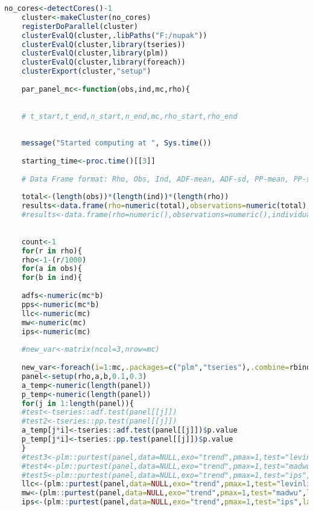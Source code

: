 \begin{lstlisting}[language=R]
	no_cores<-detectCores()-1
	cluster<-makeCluster(no_cores)
	registerDoParallel(cluster)
	clusterEvalQ(cluster,.libPaths("F:/nupak"))
	clusterEvalQ(cluster,library(tseries))
	clusterEvalQ(cluster,library(plm))
	clusterEvalQ(cluster,library(foreach))
	clusterExport(cluster,"setup")
	
	par_panel_mc<-function(obs,ind,mc,rho){
	
	
	# t_start,t_end,n_start,n_end,mc,rho_start,rho_end
	
	
	message("Started computing at ", Sys.time())
	
	starting_time<-proc.time()[[3]]
	
	# Data Frame format: Rho, Obs, Ind, ADF-mean, ADF-sd, PP-mean, PP-sd, LLC-mean, LLC-sd, MW-mean, MW-sd, MC?
	
	total<-(length(obs))*(length(ind))*(length(rho))
	results<-data.frame(rho=numeric(total),observations=numeric(total),individuals=numeric(total),adf_mean=numeric(total),adf_sd=numeric(total),pp_mean=numeric(total),pp_sd=numeric(total),llc_mean=numeric(total),llc_sd=numeric(total),mw_mean=numeric(total),mw_sd=numeric(total),ips_mean=numeric(total),ips_sd=numeric(total))
	#results<-data.frame(rho=numeric(),observations=numeric(),individuals=numeric(),adf_mean=numeric(),adf_sd=numeric(),pp_mean=numeric(),pp_sd=numeric(),llc_mean=numeric(),llc_sd=numeric(),mw_mean=numeric(),mw_sd=numeric())
	
	
	count<-1
	for(r in rho){
	rho<-1-(r/1000)
	for(a in obs){
	for(b in ind){
	
	adfs<-numeric(mc*b)
	pps<-numeric(mc*b)
	llc<-numeric(mc)
	mw<-numeric(mc)
	ips<-numeric(mc)
	
	#new_var<-matrix(ncol=3,nrow=mc)
	
	new_var<-foreach(i=1:mc,.packages=c("plm","tseries"),.combine=rbind) %dopar% {
	panel<-setup(rho,a,b,0.1,0.3)
	a_temp<-numeric(length(panel))
	p_temp<-numeric(length(panel))
	for(j in 1:length(panel)){
	#test<-tseries::adf.test(panel[[j]])
	#test2<-tseries::pp.test(panel[[j]])
	a_temp[j*i]<-tseries::adf.test(panel[[j]])$p.value
	p_temp[j*i]<-tseries::pp.test(panel[[j]])$p.value
	}
	#test3<-plm::purtest(panel,data=NULL,exo="trend",pmax=1,test="levinlin",lags="AIC")
	#test4<-plm::purtest(panel,data=NULL,exo="trend",pmax=1,test="madwu",lags="AIC")
	#test5<-plm::purtest(panel,data=NULL,exo="trend",pmax=1,test="ips",lags="AIC")
	llc<-(plm::purtest(panel,data=NULL,exo="trend",pmax=1,test="levinlin",lags="AIC"))$statistic$p.value[[1]]
	mw<-(plm::purtest(panel,data=NULL,exo="trend",pmax=1,test="madwu",lags="AIC"))$statistic$p.value[[1]]
	ips<-(plm::purtest(panel,data=NULL,exo="trend",pmax=1,test="ips",lags="AIC"))$statistic$p.value[[1]]
	

\end{lstlisting}
